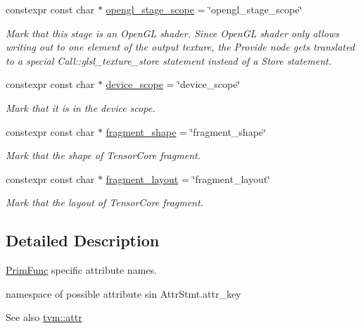 \begin{DoxyCompactItemize}
constexpr const char $\ast$ \hyperlink{namespacetvm_1_1tir_1_1attr_ae486f902462321bf26244a9c5b19098c}{opengl\+\_\+stage\+\_\+scope} = \char`\"{}opengl\+\_\+stage\+\_\+scope\char`\"{}
\begin{DoxyCompactList}\small\item\em Mark that this stage is an Open\+GL shader. Since Open\+GL shader only allows writing out to one element of the output texture, the Provide node gets translated to a special Call\+::glsl\+\_\+texture\+\_\+store statement instead of a Store statement. \end{DoxyCompactList}\item 
constexpr const char $\ast$ \hyperlink{namespacetvm_1_1tir_1_1attr_a36db026f638ad3d951c302796ddcae24}{device\+\_\+scope} = \char`\"{}device\+\_\+scope\char`\"{}
\begin{DoxyCompactList}\small\item\em Mark that it is in the device scope. \end{DoxyCompactList}\item 
constexpr const char $\ast$ \hyperlink{namespacetvm_1_1tir_1_1attr_a93d76d80fd7252d66991dc650693c0ef}{fragment\+\_\+shape} = \char`\"{}fragment\+\_\+shape\char`\"{}
\begin{DoxyCompactList}\small\item\em Mark that the shape of Tensor\+Core fragment. \end{DoxyCompactList}\item 
constexpr const char $\ast$ \hyperlink{namespacetvm_1_1tir_1_1attr_a9b33cc65f756817e691b49782ee103bd}{fragment\+\_\+layout} = \char`\"{}fragment\+\_\+layout\char`\"{}
\begin{DoxyCompactList}\small\item\em Mark that the layout of Tensor\+Core fragment. \end{DoxyCompactList}\end{DoxyCompactItemize}


\subsection{Detailed Description}
\hyperlink{classtvm_1_1tir_1_1PrimFunc}{Prim\+Func} specific attribute names. 

namespace of possible attribute sin Attr\+Stmt.\+attr\+\_\+key

\begin{DoxySeeAlso}{See also}
\hyperlink{namespacetvm_1_1attr}{tvm\+::attr} 
\end{DoxySeeAlso}


